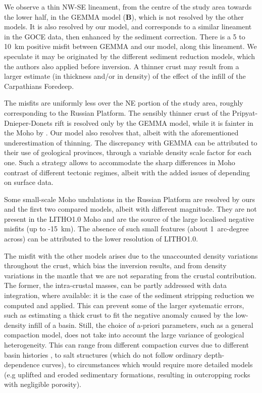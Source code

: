 {We observe a thin NW-SE lineament, from the centre of the study area towards the lower half, in the GEMMA model (\textbf{B}), which is not resolved by the other models.
It is also resolved by our model, and corresponds to a similar lineament in the GOCE data, then enhanced by the sediment correction.
There is a 5 to 10~km positive misfit between GEMMA and our model, along this lineament.
We speculate it may be originated by the different sediment reduction models, which the authors also applied before inversion.
A thinner crust may result from a larger estimate (in thickness and/or in density) of the effect of the infill of the Carpathians Foredeep.

The misfits are uniformly less over the NE portion of the study area, roughly corresponding to the Russian Platform.
The sensibly thinner crust of the Pripyat-Dnieper-Donets rift is resolved only by the GEMMA model, while it is fainter in the Moho by \textcite{Grad2009}.
Our model also resolves that, albeit with the aforementioned underestimation of thinning.
The discrepancy with GEMMA can be attributed to their use of geological provinces, through a variable density scale factor for each one. Such a strategy allows to accommodate the sharp differences in Moho contrast of different tectonic regimes, albeit with the added issues of depending on surface data.

Some small-scale Moho undulations in the Russian Platform are resolved by ours and the first two compared models, albeit with different magnitude.
They are not present in the LITHO1.0 Moho and are the source of the large localised negative misfits (up to -15~km).
The absence of such small features (about 1~arc-degree across) can be attributed to the lower resolution of LITHO1.0.

The misfit with the other models arises due to the unaccounted density variations throughout the crust, which bias the inversion results, and from density variations in the mantle that we are not separating from the crustal contribution.
The former, the intra-crustal masses, can be partly addressed with data integration, where available: it is the case of the sediment stripping reduction we computed and applied.
This can prevent some of the larger systematic errors, such as estimating a thick crust to fit the negative anomaly caused by the low-density infill of a basin.
Still, the choice of a-priori parameters, such as a general compaction model, does not take into account the large variance of geological heterogeneity.
This can range from different compaction curves due to different basin histories \textcite{allen2013basin}, to salt structures (which do not follow ordinary depth-dependence curves), to circumstances which would require more detailed models (e.g uplifted and eroded sedimentary formations, resulting in outcropping rocks with negligible porosity).

}
